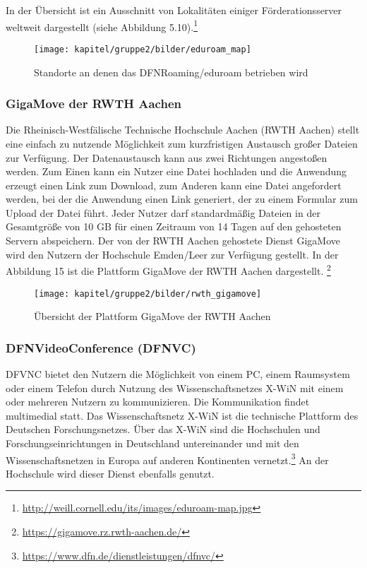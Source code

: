 In der Übersicht ist ein Ausschnitt von Lokalitäten einiger Förderationsserver weltweit dargestellt (siehe Abbildung 5.10).\footnote{\url{http://weill.cornell.edu/its/images/eduroam-map.jpg}}

\begin{figure}[h!]
	\centering
	\texttt{[image: kapitel/gruppe2/bilder/eduroam\_map]}
	\caption{Standorte an denen das DFNRoaming/eduroam betrieben wird}
	\label{fig_map_eduroam}
\end{figure}

\subsubsection{GigaMove der RWTH Aachen}
Die Rheinisch-Westfälische Technische Hochschule Aachen (RWTH Aachen) stellt eine einfach zu nutzende Möglichkeit zum kurzfristigen Austausch großer Dateien zur Verfügung. Der Datenaustausch kann aus zwei Richtungen angestoßen werden. Zum Einen kann ein Nutzer eine Datei hochladen und die Anwendung erzeugt einen Link zum Download, zum Anderen kann eine Datei angefordert werden, bei der die Anwendung einen Link generiert, der zu einem Formular zum Upload der Datei führt. Jeder Nutzer darf standardmäßig Dateien in der Gesamtgröße von 10 GB für einen Zeitraum von 14 Tagen auf den gehosteten Servern abspeichern. Der von der RWTH Aachen gehostete Dienst GigaMove wird den Nutzern der Hochschule Emden/Leer zur Verfügung gestellt. In der Abbildung 15 ist die Plattform GigaMove der RWTH Aachen dargestellt. \footnote{\url{https://gigamove.rz.rwth-aachen.de/}} 

\begin{figure}
	\centering
	\texttt{[image: kapitel/gruppe2/bilder/rwth\_gigamove]}
	\caption{Übersicht der Plattform GigaMove der RWTH Aachen}
	\label{fig_rwth_gigamove}
\end{figure}

\subsubsection{DFNVideoConference (DFNVC)}
DFVNC bietet den Nutzern die Möglichkeit von einem PC, einem Raumsystem oder einem Telefon durch Nutzung des Wissenschaftsnetzes X-WiN mit einem oder mehreren Nutzern zu kommunizieren. Die Kommunikation findet multimedial statt. Das Wissenschaftsnetz X-WiN ist die technische Plattform des Deutschen Forschungsnetzes. Über das X-WiN sind die Hochschulen und Forschungseinrichtungen in Deutschland untereinander und mit den Wissenschaftsnetzen in Europa auf anderen Kontinenten vernetzt.\footnote{\url{https://www.dfn.de/dienstleistungen/dfnvc/}} An der Hochschule wird dieser Dienst ebenfalls genutzt.

